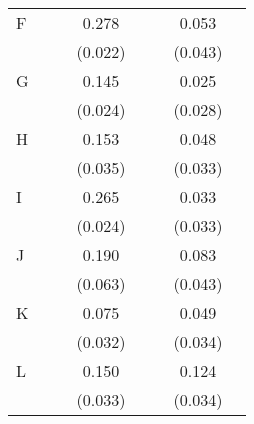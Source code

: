 {\begin{longtable}{l*{3}{c}|l*{3}{c}}
		F                   &                     &                     &       0.278\sym{***}&                     &                     &       0.053         \\
		&                     &                     &     (0.022)         &                     &                     &     (0.043)         \\
		G                   &                     &                     &       0.145\sym{***}&                     &                     &       0.025         \\
		&                     &                     &     (0.024)         &                     &                     &     (0.028)         \\
		H                   &                     &                     &       0.153\sym{***}&                     &                     &       0.048         \\
		&                     &                     &     (0.035)         &                     &                     &     (0.033)         \\
		I                   &                     &                     &       0.265\sym{***}&                     &                     &       0.033         \\
		&                     &                     &     (0.024)         &                     &                     &     (0.033)         \\
		J                   &                     &                     &       0.190\sym{**} &                     &                     &       0.083         \\
		&                     &                     &     (0.063)         &                     &                     &     (0.043)         \\
		K                   &                     &                     &       0.075\sym{*}  &                     &                     &       0.049         \\
		&                     &                     &     (0.032)         &                     &                     &     (0.034)         \\
		L                   &                     &                     &       0.150\sym{***}&                     &                     &       0.124\sym{***}\\
		&                     &                     &     (0.033)         &                     &                     &     (0.034)         \\

\end{longtable}}
